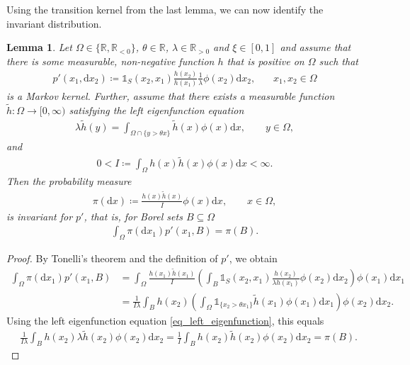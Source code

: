 \documentclass[10pt,a4paper]{amsart}
\newcommand{\R}{\mathbb{R}} %
\newcommand{\1}{\mathds{1}}
\renewcommand{\d}{\mathrm{d}}
\newtheorem{Lemma}[definition]{Lemma}
\begin{document}
Using the transition kernel from the last lemma, we can now identify the invariant distribution.
\begin{Lemma}\label{invariant_distribution_limiting_process} 
Let $\Omega\in\{\R,\R_{<0}\}$, $\theta\in\R$, $\lambda\in\R_{>0}$ and $\xi\in[0,1]$ and assume that there is some measurable, non-negative function $h$ that is positive on $\Omega$ such that
\begin{align*}
    p'(x_1,\d x_2)\coloneqq \mathds{1}_S(x_2,x_{1})\frac{h(x_2)}{h(x_1)}\frac{1}{\lambda}\phi(x_2)\d x_2,~~~~~~~~x_1,x_2\in \Omega
\end{align*}
is a Markov kernel. Further, assume that there exists a measurable function $\tilde h:\Omega\to[0,\infty)$ satisfying the left eigenfunction equation \begin{align}\label{eq_left_eigenfunction} 
\lambda \tilde h(y)=\int_{\Omega\cap\{y>\theta x\}}\tilde h(x)\phi(x)\d x,\qquad y\in\Omega,
\end{align} 
and
\begin{align*} 
0< I\coloneqq \int_\Omega h(x)\tilde h(x)\phi(x)\d x <\infty. 
\end{align*} 
Then the probability measure 
\begin{align*} 
\pi(\d x) \coloneqq \frac{h(x)\tilde h(x)}{I} \phi(x)\d x,\qquad x\in\Omega,
\end{align*} 
is invariant for $p'$, that is, for Borel sets $B\subseteq\Omega$
\begin{align*} 
\int_\Omega \pi(\d x_1)p'(x_1,B) = \pi(B). %
\end{align*} 
\end{Lemma} 
\begin{proof} 
By Tonelli's theorem and the definition of $p'$, we obtain 
\begin{align*} 
\int_\Omega \pi(\d x_1)p'(x_1,B) 
&= \int_\Omega \frac{h(x_1)\tilde h(x_1)}{I} \left( \int_B \mathds{1}_S(x_2,x_1) \frac{h(x_2)}{\lambda h(x_1)} \phi(x_2)\d x_2 \right) \phi(x_1)\d x_1 
\\ &= \frac{1}{I\lambda} \int_B h(x_2) \left( \int_\Omega \mathds{1}_{\{x_2>\theta x_1\}} \tilde h(x_1) \phi(x_1)\d x_1 \right) \phi(x_2)\d x_2. 
\end{align*} 
Using the left eigenfunction equation \eqref{eq_left_eigenfunction}, this equals
\begin{align*} 
& \frac{1}{I\lambda} \int_B h(x_2)\lambda\tilde h(x_2) \phi(x_2)\d x_2
= \frac{1}{I} \int_B h(x_2)\tilde h(x_2) \phi(x_2)\d x_2 
= \pi(B). \tag*{\qedhere}
\end{align*} 
\end{proof}
\end{document}
